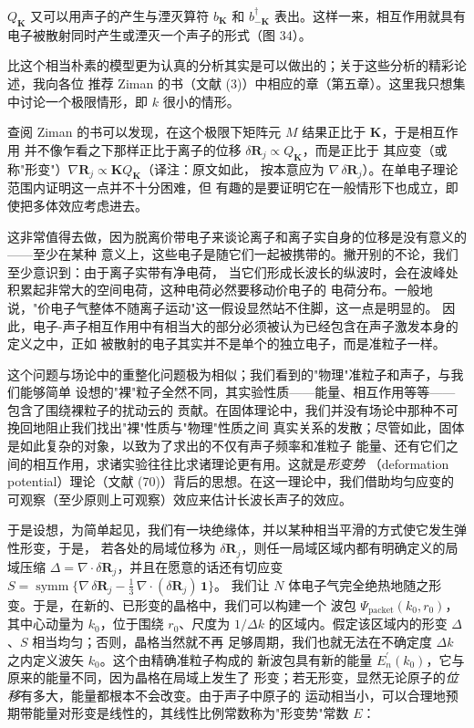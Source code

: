 $Q_{\mathbf{K}}$ 又可以用声子的产生与湮灭算符 $b_{\mathbf{K}}$ 和 $b_{-\mathbf{K}}^{\dagger}$
表出。这样一来，相互作用就具有电子被散射同时产生或湮灭一个声子的形式（图 34）。


比这个相当朴素的模型更为认真的分析其实是可以做出的；关于这些分析的精彩论述，我向各位
推荐 Ziman 的书（文献 (3)）中相应的章（第五章）。这里我只想集中讨论一个极限情形，即
$k$ 很小的情形。

查阅 Ziman 的书可以发现，在这个极限下矩阵元 $M$ 结果正比于 $\mathbf{K}$，于是相互作用
并不像乍看之下那样正比于离子的位移 $\delta\mathbf{R}_{j}\propto Q_{\mathbf{K}}$，而是正比于
其应变（或称"形变"）$\nabla\mathbf{R}_{j}\propto\mathbf{K}Q_{\mathbf{K}}$（译注：原文如此，
按本意应为 $\nabla\,\delta\mathbf{R}_{j}$）。在单电子理论范围内证明这一点并不十分困难，但
有趣的是要证明它在一般情形下也成立，即使把多体效应考虑进去。

这非常值得去做，因为脱离价带电子来谈论离子和离子实自身的位移是没有意义的——至少在某种
意义上，这些电子是随它们一起被携带的。撇开别的不论，我们至少意识到：由于离子实带有净电荷，
当它们形成长波长的纵波时，会在波峰处积累起非常大的空间电荷，这种电荷必然要移动价电子的
电荷分布。一般地说，"价电子气整体不随离子运动"这一假设显然站不住脚，这一点是明显的。
因此，电子-声子相互作用中有相当大的部分必须被认为已经包含在声子激发本身的定义之中，正如
被散射的电子其实并不是单个的独立电子，而是准粒子一样。

这个问题与场论中的重整化问题极为相似；我们看到的"物理"准粒子和声子，与我们能够简单
设想的"裸"粒子全然不同，其实验性质——能量、相互作用等等——包含了围绕裸粒子的扰动云的
贡献。在固体理论中，我们并没有场论中那种不可挽回地阻止我们找出"裸"性质与"物理"性质之间
真实关系的发散；尽管如此，固体是如此复杂的对象，以致为了求出的不仅有声子频率和准粒子
能量、还有它们之间的相互作用，求诸实验往往比求诸理论更有用。这就是\emph{形变势}
（deformation potential）理论（文献 (70)）背后的思想。在这一理论中，我们借助均匀应变的
可观察（至少原则上可观察）效应来估计长波长声子的效应。

于是设想，为简单起见，我们有一块绝缘体，并以某种相当平滑的方式使它发生弹性形变，于是，
若各处的局域位移为 $\delta\mathbf{R}_{j}$，则任一局域区域内都有明确定义的局域压缩
$\Delta=\nabla\cdot\delta\mathbf{R}_{j}$，并且在愿意的话还有切应变
$S=\operatorname{symm}\bigl\{\nabla\,\delta\mathbf{R}_{j}-\tfrac{1}{3}\,\nabla\cdot(\delta\mathbf{R}_{j})\,\mathbf{1}\bigr\}$。
我们让 $N$ 体电子气完全绝热地随之形变。于是，在新的、已形变的晶格中，我们可以构建一个
波包 $\Psi_{\text{packet}}(k_{0},r_{0})$，其中心动量为 $k_{0}$，位于围绕 $r_{0}$、尺度为
$1/\Delta k$ 的区域内。假定该区域内的形变 $\Delta$、$S$ 相当均匀；否则，晶格当然就不再
足够周期，我们也就无法在不确定度 $\Delta k$ 之内定义波矢 $k_{0}$。这个由精确准粒子构成的
新波包具有新的能量 $E^{\prime}_{n}(k_{0})$，它与原来的能量不同，因为晶格在局域上发生了
形变；若无形变，显然无论原子的\emph{位移}有多大，能量都根本不会改变。由于声子中原子的
运动相当小，可以合理地预期带能量对形变是线性的，其线性比例常数称为"形变势"常数 $E$：

